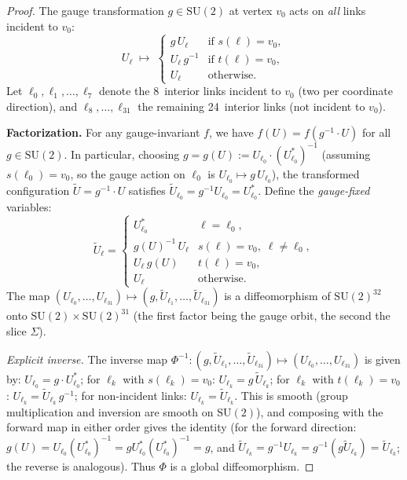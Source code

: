 \documentclass[11pt]{article}
\theoremstyle{definition}
\newcommand{\SU}{\mathrm{SU}}
\begin{document}
\begin{proof}
The gauge transformation $g\in\SU(2)$ at vertex $v_0$ acts on
\emph{all} links incident to $v_0$:
\begin{equation}\label{eq:gauge-action-full}
U_\ell\;\longmapsto\;
\begin{cases}
g\,U_\ell & \text{if }s(\ell)=v_0,\\
U_\ell\,g^{-1} & \text{if }t(\ell)=v_0,\\
U_\ell & \text{otherwise}.
\end{cases}
\end{equation}
Let $\ell_0,\ell_1,\ldots,\ell_7$ denote the 8~interior links incident
to $v_0$ (two per coordinate direction), and
$\ell_8,\ldots,\ell_{31}$ the remaining 24~interior links (not
incident to $v_0$).

\textbf{Factorization.}
For any gauge-invariant $f$, we have
$f(U)=f(g^{-1}\cdot U)$ for all $g\in\SU(2)$.
In particular, choosing $g=g(U):=U_{\ell_0}\cdot(U_{\ell_0}^*)^{-1}$
(assuming $s(\ell_0)=v_0$, so the gauge action on $\ell_0$ is
$U_{\ell_0}\mapsto g\,U_{\ell_0}$), the transformed configuration
$\widetilde{U}=g^{-1}\cdot U$ satisfies
$\widetilde{U}_{\ell_0}=g^{-1}U_{\ell_0}=U_{\ell_0}^*$.
Define the \emph{gauge-fixed} variables:
\begin{equation}
\widetilde{U}_\ell=
\begin{cases}
U_{\ell_0}^* & \ell=\ell_0,\\
g(U)^{-1}\,U_\ell & s(\ell)=v_0,\;\ell\ne\ell_0,\\
U_\ell\,g(U) & t(\ell)=v_0,\\
U_\ell & \text{otherwise}.
\end{cases}
\end{equation}
The map $(U_{\ell_0},\ldots,U_{\ell_{31}})\mapsto
(g,\widetilde{U}_{\ell_1},\ldots,\widetilde{U}_{\ell_{31}})$
is a diffeomorphism of $\SU(2)^{32}$ onto $\SU(2)\times\SU(2)^{31}$
(the first factor being the gauge orbit, the second the slice
$\Sigma$).

\emph{Explicit inverse.}
The inverse map $\Phi^{-1}:(g,\widetilde{U}_{\ell_1},\ldots,
\widetilde{U}_{\ell_{31}})\mapsto(U_{\ell_0},\ldots,U_{\ell_{31}})$
is given by:
$U_{\ell_0}=g\cdot U_{\ell_0}^*$;
for $\ell_k$ with $s(\ell_k)=v_0$: $U_{\ell_k}=g\,\widetilde{U}_{\ell_k}$;
for $\ell_k$ with $t(\ell_k)=v_0$: $U_{\ell_k}=\widetilde{U}_{\ell_k}\,g^{-1}$;
for non-incident links: $U_{\ell_k}=\widetilde{U}_{\ell_k}$.
This is smooth (group multiplication and inversion are smooth on
$\SU(2)$), and composing with the forward map in either order gives
the identity (for the forward direction:
$g(U)=U_{\ell_0}(U_{\ell_0}^*)^{-1}=gU_{\ell_0}^*(U_{\ell_0}^*)^{-1}=g$,
and $\widetilde{U}_{\ell_k}=g^{-1}U_{\ell_k}
=g^{-1}(g\widetilde{U}_{\ell_k})=\widetilde{U}_{\ell_k}$; the reverse
is analogous).  Thus $\Phi$ is a global diffeomorphism.


\end{proof}
\end{document}
